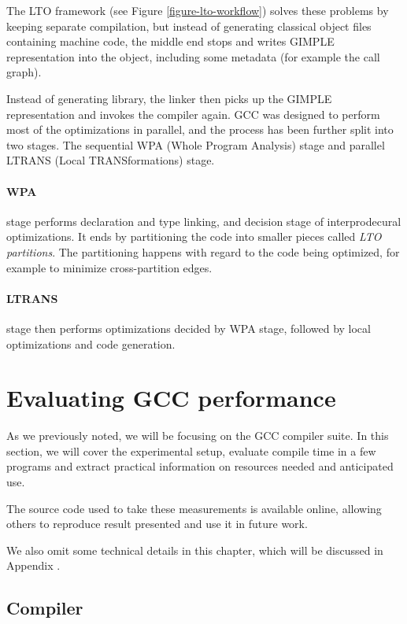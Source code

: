 The LTO framework (see Figure \ref{figure-lto-workflow}) solves these problems by keeping separate compilation, but
instead of generating classical object files containing machine code, the
middle end stops and writes GIMPLE representation into the object, including
some metadata (for example the call graph).

Instead of generating library, the linker then picks up the GIMPLE
representation and invokes the compiler again. GCC was designed to perform most
of the optimizations in parallel, and the process has been further split into
two stages. The sequential WPA (Whole Program Analysis) stage and parallel
LTRANS (Local TRANSformations) stage.

\paragraph{WPA} stage performs declaration and type linking, and decision stage
of interprodecural optimizations. It ends by partitioning the code into smaller
pieces called {\sl LTO partitions}. The partitioning happens with regard to the
code being optimized, for example to minimize cross-partition edges.

\paragraph{LTRANS} stage then performs optimizations decided by WPA stage,
followed by local optimizations and code generation.


\section{Evaluating GCC performance}

As we previously noted, we will be focusing on the GCC compiler suite. In this
section, we will cover the experimental setup, evaluate compile time in a few
programs and extract practical information on resources needed and
anticipated use.

The source code used to take these measurements is available online, allowing
others to reproduce result presented and use it in future work.

We also omit some technical details in this chapter, which will be discussed in
Appendix .

\subsection{Compiler}

